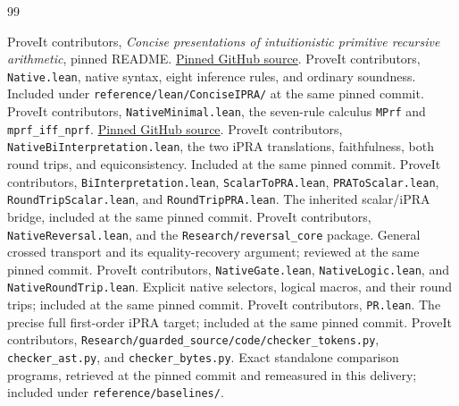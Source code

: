 \documentclass[11pt]{article}
\theoremstyle{definition}\newtheorem{definition}[theorem]{Definition}
\theoremstyle{remark}\newtheorem{remark}[theorem]{Remark}
\begin{document}
\begin{thebibliography}{99}
\small\raggedright
{} ProveIt contributors, \emph{Concise presentations of
intuitionistic primitive recursive arithmetic}, pinned README.
\href{https://github.com/VladimirReshetnikov/ProveIt/blob/8eb71c1e570e07ef45ead686628e77f18ef34798/Logic/PrimitiveRecursiveArithmetic/ConciseIPRA/README.md}{Pinned GitHub source}.
 ProveIt contributors, \texttt{Native.lean}, native syntax,
eight inference rules, and ordinary soundness. Included under
\texttt{reference/lean/ConciseIPRA/} at the same pinned commit.
 ProveIt contributors, \texttt{NativeMinimal.lean},
the seven-rule calculus \texttt{MPrf} and \texttt{mprf\_iff\_nprf}.
\href{https://github.com/VladimirReshetnikov/ProveIt/blob/8eb71c1e570e07ef45ead686628e77f18ef34798/Logic/PrimitiveRecursiveArithmetic/ConciseIPRA/Lean/ConciseIPRA/NativeMinimal.lean}{Pinned GitHub source}.
 ProveIt contributors, \texttt{NativeBiInterpretation.lean},
the two iPRA translations, faithfulness, both round trips, and
equiconsistency. Included at the same pinned commit.
 ProveIt contributors, \texttt{BiInterpretation.lean},
\texttt{ScalarToPRA.lean}, \texttt{PRAToScalar.lean},
\texttt{RoundTripScalar.lean}, and \texttt{RoundTripPRA.lean}.
The inherited scalar/iPRA bridge, included at the same pinned commit.
 ProveIt contributors, \texttt{NativeReversal.lean},
and the \texttt{Research/reversal\_core} package. General crossed transport
and its equality-recovery argument; reviewed at the same pinned commit.
 ProveIt contributors, \texttt{NativeGate.lean},
\texttt{NativeLogic.lean}, and \texttt{NativeRoundTrip.lean}.
Explicit native selectors, logical macros, and their round trips;
included at the same pinned commit.
 ProveIt contributors, \texttt{PR.lean}. The precise full
first-order iPRA target; included at the same pinned commit.
 ProveIt contributors,
\texttt{Research/guarded\_source/code/checker\_tokens.py},
\texttt{checker\_ast.py}, and \texttt{checker\_bytes.py}.
Exact standalone comparison programs, retrieved at the pinned commit and
remeasured in this delivery; included under \texttt{reference/baselines/}.
\end{thebibliography}
\end{document}
